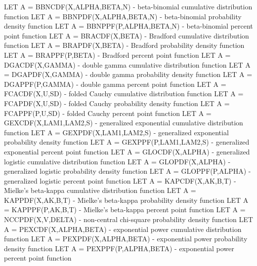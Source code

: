 {      LET A = BBNCDF(X,ALPHA,BETA,N) - beta-binomial cumulative
                                       distribution function
      LET A = BBNPDF(X,ALPHA,BETA,N) - beta-binomial probability
                                       density function
      LET A = BBNPPF(P,ALPHA,BETA,N) - beta-binomial percent point
                                       function
      LET A = BRACDF(X,BETA)   - Bradford cumulative distribution
                                       function
      LET A = BRAPDF(X,BETA)   - Bradford probability density function
      LET A = BRAPPF(P,BETA)   - Bradford percent point function
      LET A = DGACDF(X,GAMMA)  - double gamma cumulative distribution
                                 function
      LET A = DGAPDF(X,GAMMA)  - double gamma probability density
                                 function
      LET A = DGAPPF(P,GAMMA)  - double gamma percent point function
      LET A = FCACDF(X,U,SD)   - folded Cauchy cumulative distribution
                                 function
      LET A = FCAPDF(X,U,SD)   - folded Cauchy probability density
                                 function
      LET A = FCAPPF(P,U,SD)   - folded Cauchy percent point function
      LET A = GEXCDF(X,LAM1,LAM2,S) - generalized exponential
                                      cumulative distribution function
      LET A = GEXPDF(X,LAM1,LAM2,S) - generalized exponential
                                      probability density function
      LET A = GEXPPF(P,LAM1,LAM2,S) - generalized exponential
                                      percent point function
      LET A = GLOCDF(X,ALPHA)  - generalized logistic cumulative
                                 distribution function
      LET A = GLOPDF(X,ALPHA)  - generalized logistic probability
                                 density function
      LET A = GLOPPF(P,ALPHA)  - generalized logistic percent point
                                 function
      LET A = KAPCDF(X,AK,B,T) - Mielke's beta-kappa cumulative
                                 distribution function
      LET A = KAPPDF(X,AK,B,T) - Mielke's beta-kappa probability
                                 density function
      LET A = KAPPPF(P,AK,B,T) - Mielke's beta-kappa percent point
                                 function
      LET A = NCCPDF(X,V,DELTA) - non-central chi-square probability
                                  density function
      LET A = PEXCDF(X,ALPHA,BETA) - exponential power cumulative
                                     distribution function
      LET A = PEXPDF(X,ALPHA,BETA) - exponential power probability
                                     density function
      LET A = PEXPPF(P,ALPHA,BETA) - exponential power percent point
                                     function

}
